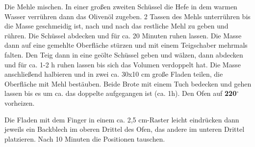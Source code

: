\vspace*{\fill}
\begin{multicols}{2}


Die Mehle mischen.
In einer großen zweiten Schüssel die Hefe in dem warmen Wasser verrühren dann das Olivenöl
zugeben. 2 Tassen des Mehls unterrühren bis die Masse geschmeidig ist, nach und nach
das restliche Mehl zu geben und rühren.\newline
Die Schüssel abdecken und für ca. 20 Minuten ruhen lassen.\newline
Die Masse dann auf eine gemehlte Oberfläche stürzen und mit einem Teigschaber mehrmals falten.
Den Teig dann in eine geölte Schüssel geben und wälzen, dann abdecken und für ca. 1-2 h ruhen lassen
bis sich das Volumen verdoppelt hat.\newline
Die Masse anschließend halbieren und in zwei ca. 30x10 cm große Fladen teilen, die Oberfläche mit Mehl
bestäuben.\newline
Beide Brote mit einem Tuch bedecken und gehen lassen bis es um ca. das doppelte aufgegangen ist (ca. 1h).
Den Ofen auf \textbf{220$^\circ$} vorheizen.\newline

Die Fladen mit dem Finger in einem ca. 2,5 cm-Raster leicht eindrücken dann jeweils ein
Backblech im oberen Drittel des Ofen, das andere im unteren Drittel platzieren.
Nach 10 Minuten die Positionen tauschen.




\end{multicols}
\vfill
